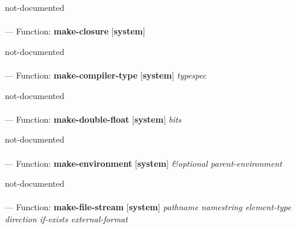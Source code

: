 \begin{adjustwidth}{5em}{5em}
not-documented
\end{adjustwidth}

\paragraph{}
\label{SYSTEM:MAKE-CLOSURE}
--- Function: \textbf{make-closure} [\textbf{system}] \textit{}

\begin{adjustwidth}{5em}{5em}
not-documented
\end{adjustwidth}

\paragraph{}
\label{SYSTEM:MAKE-COMPILER-TYPE}
--- Function: \textbf{make-compiler-type} [\textbf{system}] \textit{typespec}

\begin{adjustwidth}{5em}{5em}
not-documented
\end{adjustwidth}

\paragraph{}
\label{SYSTEM:MAKE-DOUBLE-FLOAT}
--- Function: \textbf{make-double-float} [\textbf{system}] \textit{bits}

\begin{adjustwidth}{5em}{5em}
not-documented
\end{adjustwidth}

\paragraph{}
\label{SYSTEM:MAKE-ENVIRONMENT}
--- Function: \textbf{make-environment} [\textbf{system}] \textit{\&optional parent-environment}

\begin{adjustwidth}{5em}{5em}
not-documented
\end{adjustwidth}

\paragraph{}
\label{SYSTEM:MAKE-FILE-STREAM}
--- Function: \textbf{make-file-stream} [\textbf{system}] \textit{pathname namestring element-type direction if-exists external-format}

